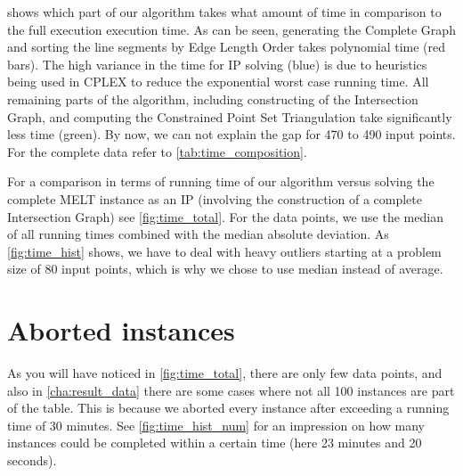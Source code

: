  shows which part of our algorithm takes
what amount of time in comparison to the full execution execution
time. As can be seen, generating the Complete Graph and sorting the
line segments by Edge Length Order takes polynomial time (red bars).
The high variance in the time for \gls{IP} solving (blue) is due to
heuristics being used in CPLEX to reduce the exponential worst case
running time. All remaining parts of the algorithm, including
constructing of the Intersection Graph, and computing the Constrained
Point Set Triangulation take significantly less time (green). By now,
we can not explain the gap for 470 to 490 input points. For the
complete data refer to \cref{tab:time_composition}.

For a comparison in terms of running time of our algorithm versus
solving the complete \gls{MELT} instance as an \gls{IP}
(involving the construction of a complete Intersection Graph) see
\cref{fig:time_total}. For the data points, we use the median of all
running times combined with the median absolute deviation. As
\cref{fig:time_hist} shows, we have to deal with heavy outliers
starting at a problem size of 80 input points, which is why we chose
to use median instead of average.

\section{Aborted instances}
\label{sec:aborted_instances}
As you will have noticed in \cref{fig:time_total}, there are only few
data points, and also in \cref{cha:result_data} there are some cases
where not all 100 instances are part of the table. This is because
we aborted every instance after exceeding a running time of 30
minutes. See \cref{fig:time_hist_num} for an impression on how many
instances could be completed within a certain time (here 23 minutes
and 20 seconds).


